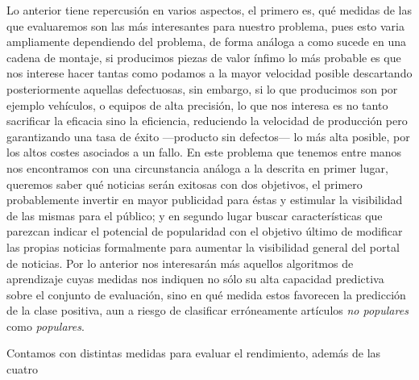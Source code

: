\documentclass{article}
\begin{document}
Lo anterior tiene repercusión en varios aspectos, el primero es, qué medidas de las que evaluaremos son las más interesantes para nuestro problema, pues esto varia ampliamente dependiendo del problema, de forma análoga a como sucede en una cadena de montaje, si producimos piezas de valor ínfimo lo más probable es que nos interese hacer tantas como podamos a la mayor velocidad posible descartando posteriormente aquellas defectuosas, sin embargo, si lo que producimos son por ejemplo vehículos, o equipos de alta precisión, lo que nos interesa es no tanto sacrificar la eficacia sino la eficiencia, reduciendo la velocidad de producción pero garantizando una tasa de éxito ---producto sin defectos--- lo más alta posible, por los altos costes asociados a un fallo. En este problema que tenemos entre manos nos encontramos con una circunstancia análoga a la descrita en primer lugar, queremos saber qué noticias serán exitosas con dos objetivos, el primero probablemente invertir en mayor publicidad para éstas y estimular la visibilidad de las mismas para el público; y en segundo lugar buscar características que parezcan indicar el potencial de popularidad con el objetivo último de modificar las propias noticias formalmente para aumentar la visibilidad general del portal de noticias. Por lo anterior nos interesarán más aquellos algoritmos de aprendizaje cuyas medidas nos indiquen no sólo su alta capacidad predictiva sobre el conjunto de evaluación, sino en qué medida estos favorecen la predicción de la clase positiva, aun a riesgo de clasificar erróneamente artículos \textit{no populares} como \textit{populares}.

Contamos con distintas medidas para evaluar el rendimiento, además de las cuatro 
\end{document}
